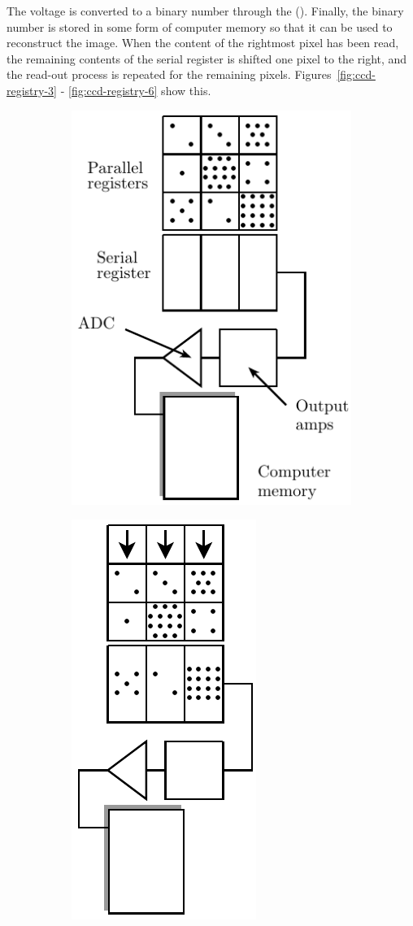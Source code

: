 The voltage is
converted to a binary number through the 
(). Finally, the binary number is stored in some form of computer
memory so that it can be used to reconstruct the image. When the
content of the rightmost pixel has been read, the remaining contents of the
serial register is shifted one pixel to the right, and the read-out process is
repeated for the remaining pixels. Figures~\ref{fig:ccd-registry-3} -
\ref{fig:ccd-registry-6} show this.
%
\begin{figure}[htpb]
	\centering
	\begin{subfigure}[t]{0.5\textwidth}
		\centering
		\includegraphics[scale=1.0]{ccd-registry-1.pdf}
		\caption{}
	\end{subfigure}%
	\begin{subfigure}[t]{0.5\textwidth}
		\centering
		\includegraphics[scale=1.0]{ccd-registry-2.pdf}

\end{subfigure}
\end{figure}
